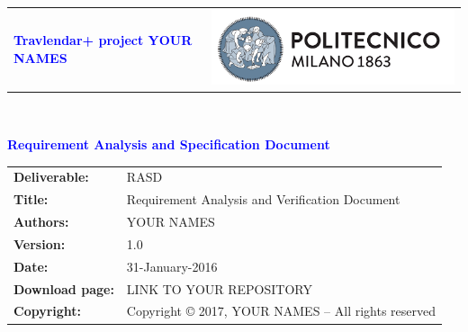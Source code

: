 


        \begin{titlepage}
                {\begin{table}[t!]
                \centering
                \begin{tabu} to \textwidth { X[1.3,r,p] X[1.7,l,p] }
                \textcolor{Blue}
                {\textbf{\small{Travlendar+ project YOUR NAMES}}} & \includegraphics[scale=0.5]{Images/PolimiLogo}
                \end{tabu}
                \end{table}}~\\ [7cm]

                \begin{flushleft}
                {\textcolor{Blue}{\textbf{\Huge{Requirement Analysis and Specification Document}}}} \\ [1cm]
                \end{flushleft}
        \end{titlepage}

        \begin{table}[h!]
                \begin{tabu} to \textwidth { X[0.3,r,p] X[0.7,l,p] }
                \hline
                
                \textbf{Deliverable:} & RASD\\
                \textbf{Title:} & Requirement Analysis and Verification Document \\
                \textbf{Authors:} & YOUR NAMES \\
                \textbf{Version:} & 1.0 \\ 
                \textbf{Date:} & 31-January-2016 \\
                \textbf{Download page:} & LINK TO YOUR REPOSITORY \\
                \textbf{Copyright:} & Copyright © 2017, YOUR NAMES – All rights reserved \\
                \hline
                \end{tabu}
        \end{table}

